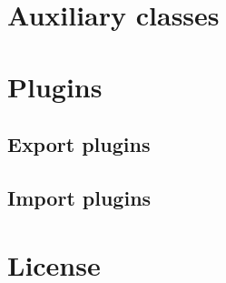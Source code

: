 \documentclass{manual}
\begin{document}





\chapter{Auxiliary classes \label{auxclasses}}





\chapter{Plugins \label{plugins}}

\section{Export plugins}





\section{Import plugins \label{importplugins}}













\appendix

%

\chapter{License}


%
%

\renewcommand{\indexname}{Module Index}

\renewcommand{\indexname}{Index}
\end{document}
